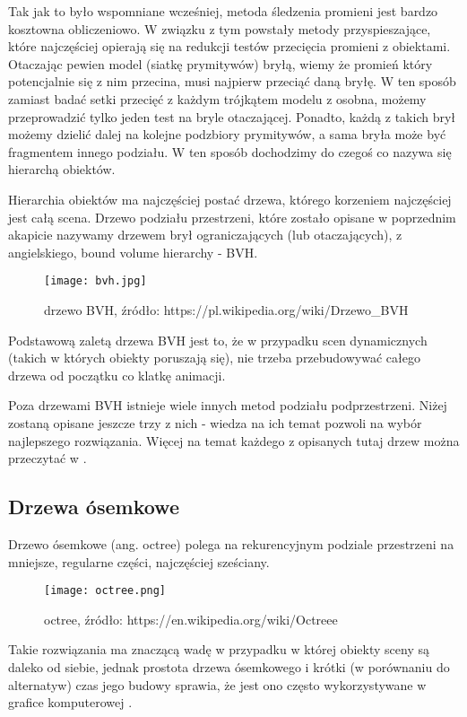 Tak jak to było wspomniane wcześniej, metoda śledzenia promieni jest bardzo kosztowna obliczeniowo. W związku z tym powstały metody przyspieszające, które najczęściej opierają się na redukcji testów przecięcia promieni z obiektami. Otaczając pewien model (siatkę prymitywów) bryłą, wiemy że promień który potencjalnie się z nim przecina, musi najpierw przeciąć daną bryłę. W ten sposób zamiast badać setki przecięć z każdym trójkątem modelu z osobna, możemy przeprowadzić tylko jeden test na bryle otaczającej. Ponadto, każdą z takich brył możemy dzielić dalej na kolejne podzbiory prymitywów, a sama bryła może być fragmentem innego podziału. W ten sposób dochodzimy do czegoś co nazywa się hierarchą obiektów.


Hierarchia obiektów ma najczęściej postać drzewa, którego korzeniem najczęściej jest całą scena. Drzewo podziału przestrzeni, które zostało opisane w poprzednim akapicie nazywamy drzewem brył ograniczających (lub otaczających), z angielskiego, bound volume hierarchy - BVH. 

\begin{figure}[h!]
\centering
  \caption{drzewo BVH, źródło: https://pl.wikipedia.org/wiki/Drzewo\_BVH}
  \texttt{[image: bvh.jpg]}
\end{figure}

Podstawową zaletą drzewa BVH jest to, że w przypadku scen dynamicznych (takich w których obiekty poruszają się), nie trzeba przebudowywać całego drzewa od początku co klatkę animacji.


Poza drzewami BVH istnieje wiele innych metod podziału podprzestrzeni. Niżej zostaną opisane jeszcze trzy z nich - wiedza na ich temat pozwoli na wybór najlepszego rozwiązania. Więcej na temat każdego z opisanych tutaj drzew można przeczytać w \cite{trees, dunn02}.

\subsection{Drzewa ósemkowe}

Drzewo ósemkowe (ang. octree) polega na rekurencyjnym podziale przestrzeni na mniejsze, regularne części, najczęściej sześciany.

\begin{figure}[h!]
\centering
  \caption{octree, źródło: https://en.wikipedia.org/wiki/Octreee}
  \texttt{[image: octree.png]}
\end{figure}

Takie rozwiązania ma znaczącą wadę w przypadku w której obiekty sceny są daleko od siebie, jednak prostota drzewa ósemkowego i krótki (w porównaniu do alternatyw) czas jego budowy sprawia, że jest ono często wykorzystywane w grafice komputerowej \cite{octree1, octree2}.

